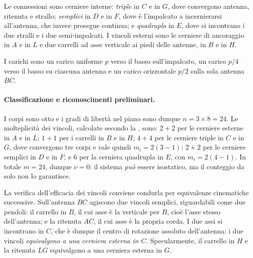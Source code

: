 Le connessioni sono cerniere interne: \emph{triple} in $C$ e
in $G$, dove convergono antenna, ritenuta e strallo;
\emph{semplici} in $D$ e in $F$, dove è l'impalcato a
incernierarsi all'antenna, che invece prosegue continua; e
\emph{quadrupla} in $E$, dove si incontrano i due stralli e
i due semi-impalcati. I vincoli esterni sono le cerniere di
ancoraggio in $A$ e in $L$ e due carrelli ad asse verticale
ai piedi delle antenne, in $B$ e in $H$.

I carichi sono un carico uniforme $p$ verso il basso
sull'impalcato, un carico $p/4$ verso il basso su ciascuna
antenna e un carico orizzontale $p/2$ sulla sola antenna
$BC$.






\paragraph{Classificazione e riconoscimenti preliminari.}

I corpi sono otto e i gradi di libertà nel piano sono
dunque $n = 3 \times 8 = 24$. Le molteplicità dei vincoli,
calcolate secondo la , sono: $2+2$ per
le cerniere esterne in $A$ e in $L$; $1+1$ per i carrelli in
$B$ e in $H$; $4+4$ per le cerniere triple in $C$ e in $G$,
dove convergono tre corpi e vale quindi $m_i = 2(3-1)$;
$2+2$ per le cerniere semplici in $D$ e in $F$; e $6$ per la
cerniera quadrupla in $E$, con $m_i = 2(4-1)$. In totale
$m = 24$, dunque $\nu = 0$: il sistema \emph{può} essere
isostatico, ma il conteggio da solo non lo garantisce.

La verifica dell'efficacia dei vincoli conviene condurla per
equivalenze cinematiche successive. Sull'antenna $BC$
agiscono due vincoli semplici, riguardabili come due
pendoli: il carrello in $B$, il cui asse è la verticale per
$B$, cioè l'asse stesso dell'antenna; e la ritenuta $AC$, il
cui asse è la propria corda. I due assi si incontrano in
$C$, che è dunque il centro di rotazione assoluto
dell'antenna: i due vincoli \emph{equivalgono a una cerniera
esterna in $C$}. Specularmente, il carrello in $H$ e la
ritenuta $LG$ equivalgono a una cerniera esterna in $G$.

